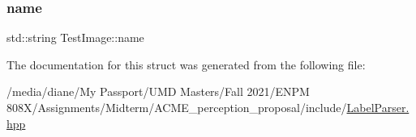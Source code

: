 \mbox{\label{struct_test_image_a53e7396d578566495ce7a5291b5e8dc5}} 
\subsubsection{\texorpdfstring{name}{name}}
{\footnotesize\ttfamily std\+::string Test\+Image\+::name}



The documentation for this struct was generated from the following file\+:\begin{DoxyCompactItemize}
\item 
/media/diane/\+My Passport/\+U\+M\+D Masters/\+Fall 2021/\+E\+N\+P\+M 808\+X/\+Assignments/\+Midterm/\+A\+C\+M\+E\+\_\+perception\+\_\+proposal/include/\hyperlink{_label_parser_8hpp}{Label\+Parser.\+hpp}\end{DoxyCompactItemize}
